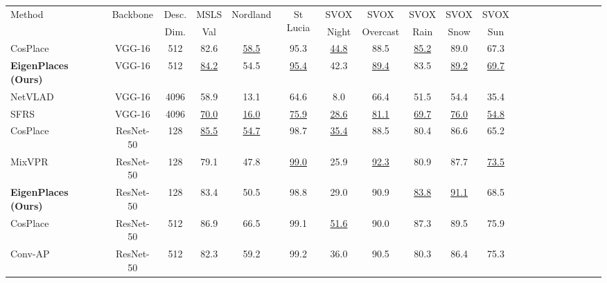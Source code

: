 \documentclass[10pt,twocolumn,letterpaper]{article}
\begin{document}
\begin{table*}
\begin{center}
\begin{adjustbox}{width=0.8\linewidth}
\centering
\begin{tabular}{lccccccccccccccccccc}
\toprule
\multirow{2}{*}{Method} & \multirow{2}{*}{Backbone} & Desc. & MSLS &
\multirow{2}{*}{Nordland} & \multirow{2}{*}{St Lucia} & SVOX & SVOX & SVOX & SVOX & SVOX \\
& & Dim. & Val & & & Night & Overcast & Rain & Snow & Sun \\
\hline


CosPlace \cite{Berton_2022_cosPlace}     & VGG-16    &  512 &           82.6 &\underline{58.5}&           95.3 &\underline{44.8}&           88.5 &\underline{85.2}&           89.0 &           67.3 \\
\textbf{EigenPlaces (Ours)}              & VGG-16    &  512 &\underline{84.2}&           54.5 &\underline{95.4}&           42.3 &\underline{89.4}&           83.5 &\underline{89.2}&\underline{69.7}\\
\hline
NetVLAD \cite{Arandjelovic_2018_netvlad} & VGG-16    & 4096 &           58.9 &           13.1 &           64.6 &            8.0 &           66.4 &           51.5 &           54.4 &           35.4 \\
SFRS \cite{Ge_2020_sfrs}                 & VGG-16    & 4096 &\underline{70.0}&\underline{16.0}&\underline{75.9}&\underline{28.6}&\underline{81.1}&\underline{69.7}&\underline{76.0}&\underline{54.8}\\
\hline
CosPlace \cite{Berton_2022_cosPlace}     & ResNet-50 &  128 &\underline{85.5}&\underline{54.7}&           98.7 &\underline{35.4}&           88.5 &           80.4 &           86.6 &           65.2 \\
MixVPR \cite{Alibey_2023_mixvpr}         & ResNet-50 &  128 &           79.1 &           47.8 &\underline{99.0}&           25.9 &\underline{92.3}&           80.9 &           87.7 &\underline{73.5}\\
\textbf{EigenPlaces (Ours)}              & ResNet-50 &  128 &           83.4 &           50.5 &           98.8 &           29.0 &           90.9 &\underline{83.8}&\underline{91.1}&           68.5 \\
\hline
CosPlace \cite{Berton_2022_cosPlace}     & ResNet-50 &  512 &           86.9 &           66.5 &           99.1 &\underline{51.6}&           90.0 &           87.3 &           89.5 &           75.9 \\
Conv-AP \cite{Alibey_2022_gsvcities}     & ResNet-50 &  512 &           82.3 &           59.2 &           99.2 &           36.0 &           90.5 &           80.3 &           86.4 &           75.3 \\

\end{tabular}
\end{adjustbox}
\end{center}
\end{table*}
\end{document}

